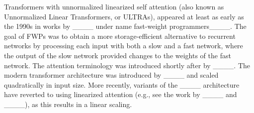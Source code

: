 Transformers with unnormalized linearized self attention (also known as Unnormalized Linear Transformers, or ULTRAs), appeared at least as early as the 1990s in works by ____ under name fast-weight programmers____.
The goal of FWPs was to obtain a more storage-efficient alternative to recurrent networks by processing each input with both a slow and a fast network, where the output of the slow network provided changes to the weights of the fast network.
The attention terminology was introduced shortly after by ____.
The modern transformer architecture was introduced by ____ and scaled quadratically in input size.
More recently, variants of the ____ architecture have reverted to using linearized attention (e.g., see the work by ____ and ____), as this results in a linear scaling.